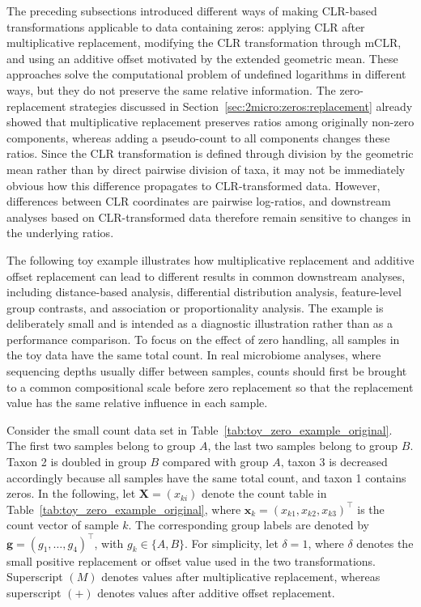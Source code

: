 The preceding subsections introduced different ways of making CLR-based transformations applicable to data containing zeros: applying CLR after multiplicative replacement, modifying the CLR transformation through mCLR, and using an additive offset motivated by the extended geometric mean. These approaches solve the computational problem of undefined logarithms in different ways, but they do not preserve the same relative information. The zero-replacement strategies discussed in Section~\ref{sec:2micro:zeros:replacement} already showed that multiplicative replacement preserves ratios among originally non-zero components, whereas adding a pseudo-count to all components changes these ratios. Since the CLR transformation is defined through division by the geometric mean rather than by direct pairwise division of taxa, it may not be immediately obvious how this difference propagates to CLR-transformed data. However, differences between CLR coordinates are pairwise log-ratios, and downstream analyses based on CLR-transformed data therefore remain sensitive to changes in the underlying ratios.

The following toy example illustrates how multiplicative replacement and additive offset replacement can lead to different results in common downstream analyses, including distance-based analysis, differential distribution analysis, feature-level group contrasts, and association or proportionality analysis. The example is deliberately small and is intended as a diagnostic illustration rather than as a performance comparison. To focus on the effect of zero handling, all samples in the toy data have the same total count. In real microbiome analyses, where sequencing depths usually differ between samples, counts should first be brought to a common compositional scale before zero replacement so that the replacement value has the same relative influence in each sample.

Consider the small count data set in Table~\ref{tab:toy_zero_example_original}. The first two samples belong to group $A$, the last two samples belong to group $B$. Taxon 2 is doubled in group $B$ compared with group $A$, taxon 3 is decreased accordingly because all samples have the same total count, and taxon 1 contains zeros. In the following, let $\mathbf{X}=(x_{ki})$ denote the count table in Table~\ref{tab:toy_zero_example_original}, where $\mathbf{x}_k=(x_{k1},x_{k2},x_{k3})^\top$ is the count vector of sample $k$. The corresponding group labels are denoted by $\mathbf{g}=(g_1,\ldots,g_4)^\top$, with $g_k\in\{A,B\}$. For simplicity, let $\delta=1$, where $\delta$ denotes the small positive replacement or offset value used in the two transformations. Superscript $(M)$ denotes values after multiplicative replacement, whereas superscript $(+)$ denotes values after additive offset replacement.

